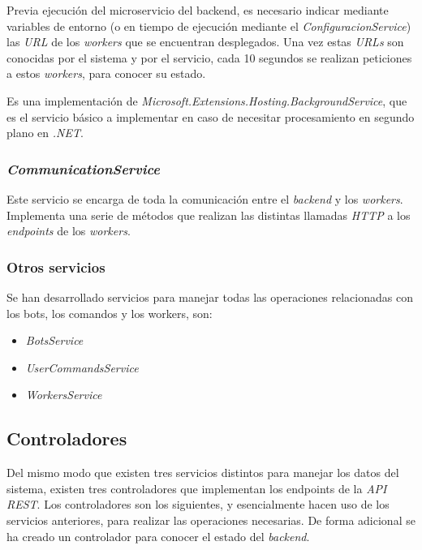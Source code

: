 Previa ejecución del microservicio del backend, es necesario indicar mediante variables de entorno (o en tiempo de ejecución mediante el \textit{ConfiguracionService}) las \textit{URL} de los \textit{workers} que se encuentran desplegados. Una vez estas \textit{URLs} son conocidas por el sistema y por el servicio, cada 10 segundos se realizan peticiones a estos \textit{workers}, para conocer su estado.

Es una implementación de \textit{Microsoft.Extensions.Hosting.BackgroundService}, que es el servicio básico a implementar en caso de necesitar procesamiento en segundo plano en \textit{.NET}.

\subsubsection{\textit{CommunicationService}}

Este servicio se encarga de toda la comunicación entre el \textit{backend} y los \textit{workers}. Implementa una serie de métodos que realizan las distintas llamadas \textit{HTTP} a los \textit{endpoints} de los \textit{workers}.

\subsubsection{Otros servicios}

Se han desarrollado servicios para manejar todas las operaciones relacionadas con los bots, los comandos y los workers, son:

\begin{itemize}
	\item \textit{BotsService}
	\item \textit{UserCommandsService} 
	\item \textit{WorkersService} 
\end{itemize}

\subsection{Controladores}

Del mismo modo que existen tres servicios distintos para manejar los datos del sistema, existen tres controladores que implementan los endpoints de la \textit{API REST}. Los controladores son los siguientes, y esencialmente hacen uso de los servicios anteriores, para realizar las operaciones necesarias. De forma adicional se ha creado un controlador para conocer el estado del \textit{backend}.

